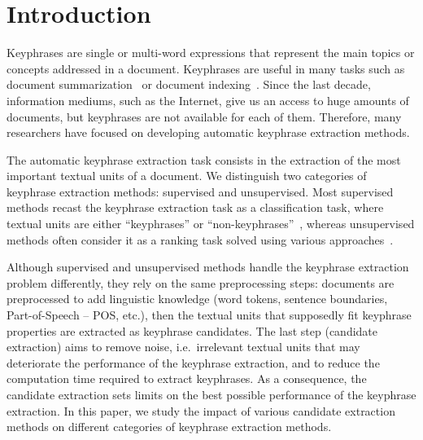 \section{Introduction}
\label{sec:section}
  Keyphrases are single or multi-word expressions that represent the main topics
  or concepts addressed in a document. Keyphrases are useful in many tasks such
  as document summarization~\cite{avanzo2005keyphrase} or document
  indexing~\cite{medelyan2008smalltrainingset}. Since the last decade,
  information mediums, such as the Internet, give us an access to huge amounts
  of documents, but keyphrases are not available for each of them. Therefore,
  many researchers have focused on developing automatic keyphrase extraction
  methods.

  The automatic keyphrase extraction task consists in the extraction of the
  most important textual units of a document. We distinguish two categories of
  keyphrase extraction methods: supervised and unsupervised. Most supervised
  methods recast the keyphrase extraction task as a classification task, where
  textual units are either ``keyphrases'' or
  ``non-keyphrases''~\cite{witten1999kea}, whereas unsupervised methods often
  consider it as a ranking task solved using various
  approaches~\cite{hassan2010conundrums}.

  Although supervised and unsupervised methods handle the keyphrase extraction
  problem differently, they rely on the same preprocessing steps: documents are
  preprocessed to add linguistic knowledge (word tokens, sentence boundaries,
  Part-of-Speech -- POS, etc.), then the textual units that supposedly fit
  keyphrase properties are extracted as keyphrase candidates. The last step
  (candidate extraction) aims to remove noise, i.e.~irrelevant textual units
  that may deteriorate the performance of the keyphrase extraction, and to
  reduce the computation time required to extract keyphrases. As a consequence,
  the candidate extraction sets limits on the best possible performance of the
  keyphrase extraction. In this paper, we study the impact of various candidate
  extraction methods on different categories of keyphrase extraction methods.

